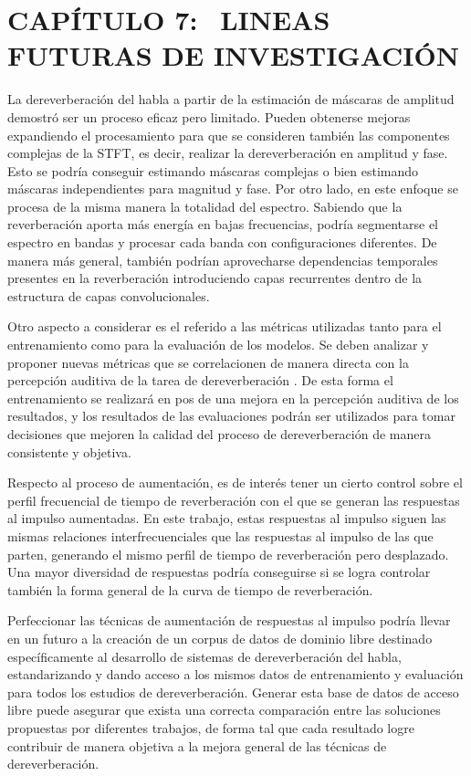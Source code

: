 \section[Lineas futuras de investigación]{CAPÍTULO 7:$\ \ \ \ $LINEAS FUTURAS DE INVESTIGACIÓN} 

La dereverberación del habla a partir de la estimación de máscaras de amplitud demostró ser un proceso eficaz pero limitado. Pueden obtenerse mejoras expandiendo el procesamiento para que se consideren también las componentes complejas de la STFT, es decir, realizar la dereverberación en amplitud y fase. Esto se podría conseguir estimando máscaras complejas o bien estimando máscaras independientes para magnitud y fase. Por otro lado, en este enfoque se procesa de la misma manera la totalidad del espectro. Sabiendo que la reverberación aporta más energía en bajas frecuencias, podría segmentarse el espectro en bandas y procesar cada banda con configuraciones diferentes. 
De manera más general, también podrían aprovecharse dependencias temporales presentes en la reverberación introduciendo capas recurrentes dentro de la estructura de capas convolucionales. 

Otro aspecto a considerar es el referido a las métricas utilizadas tanto para el entrenamiento como para la evaluación de los modelos. Se deben analizar y proponer nuevas métricas que se correlacionen de manera directa con la percepción auditiva de la tarea de dereverberación \cite{CDPAM}. De esta forma el entrenamiento se realizará en pos de una mejora en la percepción auditiva de los resultados, y los resultados de las evaluaciones podrán ser utilizados para tomar decisiones que mejoren la calidad del proceso de dereverberación de manera consistente y objetiva.

Respecto al proceso de aumentación, es de interés tener un cierto control sobre el perfil frecuencial de tiempo de reverberación con el que se generan las respuestas al impulso aumentadas. En este trabajo, estas respuestas al impulso siguen las mismas relaciones interfrecuenciales que las respuestas al impulso de las que parten, generando el mismo perfil de tiempo de reverberación pero desplazado. Una mayor diversidad de respuestas podría conseguirse si se logra controlar también la forma general de la curva de tiempo de reverberación. 

Perfeccionar las técnicas de aumentación de respuestas al impulso podría llevar en un futuro a la creación de un corpus de datos de dominio libre destinado específicamente al desarrollo de sistemas de dereverberación del habla, estandarizando y dando acceso a los mismos datos de entrenamiento y evaluación para todos los estudios de dereverberación. Generar esta base de datos de acceso libre puede asegurar que exista una correcta comparación entre las soluciones propuestas por diferentes trabajos, de forma tal que cada resultado logre contribuir de manera objetiva a la mejora general de las técnicas de dereverberación. 